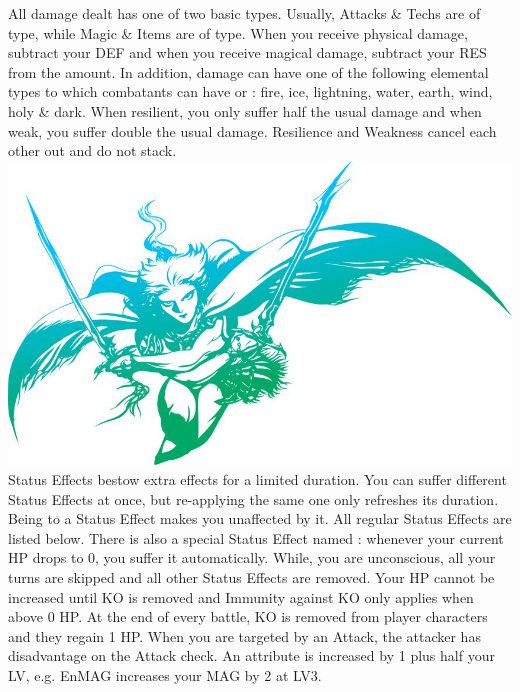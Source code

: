 %
\newpage
%
%
\newcommand{\elemicon}[1]{\hspace*{-0.14cm}#1\hspace*{-0.14cm}}
{All damage dealt has one of two basic types.
Usually, Attacks \& Techs are of  type, while Magic \& Items are of  type.
When you receive physical damage, subtract your DEF and when you receive magical damage, subtract your RES from the amount.
In addition, damage can have one of the following elemental types to which combatants can have  or : fire, ice, lightning, water, earth, wind, holy \& dark.
When resilient, you only suffer half the usual damage and when weak, you suffer double the usual damage. 
Resilience and Weakness cancel each other out and do not stack.}
%
\vfill
%
\includegraphics[width=\columnwidth]{./art/images/ff3.jpg}
%
\vfill
%
{Status Effects bestow extra effects for a limited duration.
You can suffer different Status Effects at once, but re-applying the same one only refreshes its duration.
Being  to a Status Effect makes you unaffected by it.
All regular Status Effects are listed below.
There is also a special Status Effect named : whenever your current HP drops to 0, you suffer it automatically.
While, you are unconscious, all your turns are skipped and all other Status Effects are removed.
Your HP cannot be increased until KO is removed and Immunity against KO only applies when above 0 HP.
At the end of every battle, KO is removed from player characters and they regain 1 HP.}
%
\ofrow
%
 When you are targeted by an Attack, the attacker has disadvantage on the Attack check. \ofrow
{} An attribute is increased by 1 plus half your LV, e.g. EnMAG increases your MAG by 2 at LV3.\ofrow
